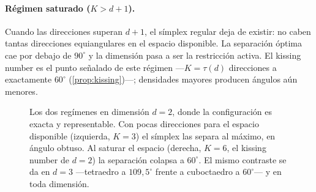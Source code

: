\documentclass[11pt,a4paper]{article}
\theoremstyle{plain}
\begin{document}
\paragraph{Régimen saturado ($K>d+1$).} Cuando las direcciones superan
$d+1$, el símplex regular deja de existir: no caben tantas direcciones
equiangulares en el espacio disponible. La separación óptima cae por
debajo de $90^\circ$ y la dimensión pasa a ser la restricción activa.
El kissing number es el punto señalado de este régimen ---$K=\tau(d)$
direcciones a exactamente $60^\circ$ (\cref{prop:kissing})---; densidades
mayores producen ángulos aún menores.

\begin{figure}[t]
\centering
{}
\caption{Los dos regímenes en dimensión $d{=}2$, donde la
configuración es exacta y representable. Con pocas direcciones para el
espacio disponible (izquierda, $K{=}3$) el símplex las separa al
máximo, en ángulo obtuso. Al saturar el espacio (derecha, $K{=}6$, el
kissing number de $d{=}2$) la separación colapsa a $60^\circ$. El mismo
contraste se da en $d{=}3$ ---tetraedro a $109{,}5^\circ$ frente a
cuboctaedro a $60^\circ$--- y en toda dimensión.}
\label{fig:regimes}
\end{figure}
\end{document}
